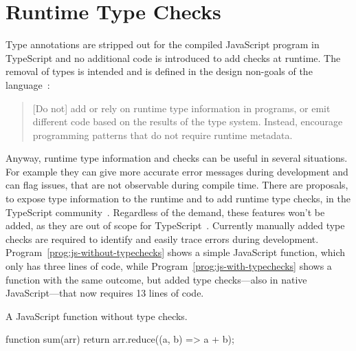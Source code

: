 \section{Runtime Type Checks}
\label{sec:runtime-type-checks}


Type annotations are stripped out for the compiled JavaScript program in TypeScript and no additional code is introduced to add checks at runtime. The removal of types is intended and is defined in the design non-goals of the language~\cite{TypeScriptWiki:DesignGoals}:
\begin{quote}
  [Do not] add or rely on runtime type information in programs,
  or emit different code based on the results of the type system.
  Instead, encourage programming patterns that do not require runtime metadata.
\end{quote}
Anyway, runtime type information and checks can be useful in several situations. 
For example they can give more accurate error messages during development and can 
flag issues, that are not observable during compile time.
There are proposals, to expose type information to the runtime and to add runtime type
checks, in the TypeScript community~\cites{TypeScriptIssue:RuntimeTypeChecking, TypeScriptIssue:RuntimeTypeChecks, TypeScriptIssue:EmitTypeArguments}. Regardless of the demand, these features won't be added, as they are out of scope
for TypeScript~\cite{TypeScriptIssue:RuntimeTypeChecking:Comment:OutOfScope, TypeScriptIssue:EmitTypeArguments:Comment:OutOfScope}.
Currently manually added type checks are required to identify and easily trace errors during development. Program~\ref{prog:js-without-typechecks} shows a simple JavaScript function, which only has three lines of code, while Program~\ref{prog:js-with-typechecks} shows a function with the same outcome, but added type 
checks---also in native JavaScript---that now requires 13 lines of code.
\begin{program}
\caption{A JavaScript function without type checks.}
\label{prog:js-without-typechecks}
\begin{JsCode}
function sum(arr) {
  return arr.reduce((a, b) =>  a + b);
}
\end{JsCode}
\end{program}
